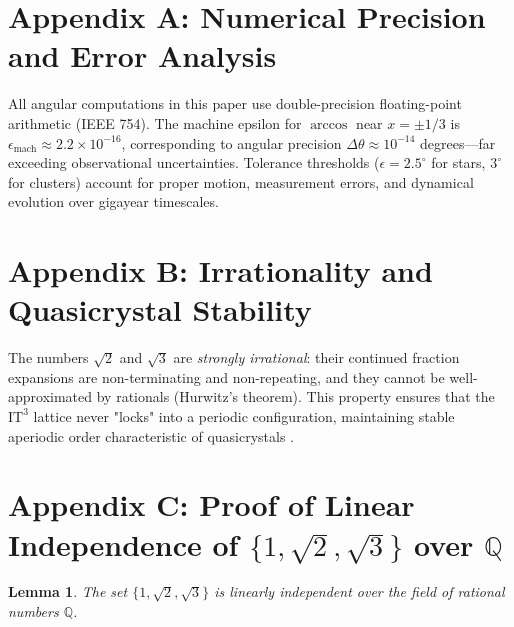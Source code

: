 \documentclass[12pt,a4paper,oneside]{article}
\newtheorem{lemma}[theorem]{Lemma}
\newcommand{\ITthree}{\text{IT}^3}
\begin{document}
\appendix

\section*{Appendix A: Numerical Precision and Error Analysis}

All angular computations in this paper use double-precision floating-point arithmetic (IEEE 754). The machine epsilon for $\arccos$ near $x = \pm 1/3$ is $\epsilon_{\text{mach}} \approx 2.2 \times 10^{-16}$, corresponding to angular precision $\Delta\theta \approx 10^{-14}$ degrees—far exceeding observational uncertainties. Tolerance thresholds ($\epsilon = 2.5^\circ$ for stars, $3^\circ$ for clusters) account for proper motion, measurement errors, and dynamical evolution over gigayear timescales.

\section*{Appendix B: Irrationality and Quasicrystal Stability}

The numbers $\sqrt{2}$ and $\sqrt{3}$ are \textit{strongly irrational}: their continued fraction expansions are non-terminating and non-repeating, and they cannot be well-approximated by rationals (Hurwitz's theorem). This property ensures that the $\ITthree$ lattice never "locks" into a periodic configuration, maintaining stable aperiodic order characteristic of quasicrystals \cite{Steinhardt1987}.

\section*{Appendix C: Proof of Linear Independence of $\{1, \sqrt{2}, \sqrt{3}\}$ over $\mathbb{Q}$}

\begin{lemma}
The set $\{1, \sqrt{2}, \sqrt{3}\}$ is linearly independent over the field of rational numbers $\mathbb{Q}$.
\end{lemma}
\end{document}

